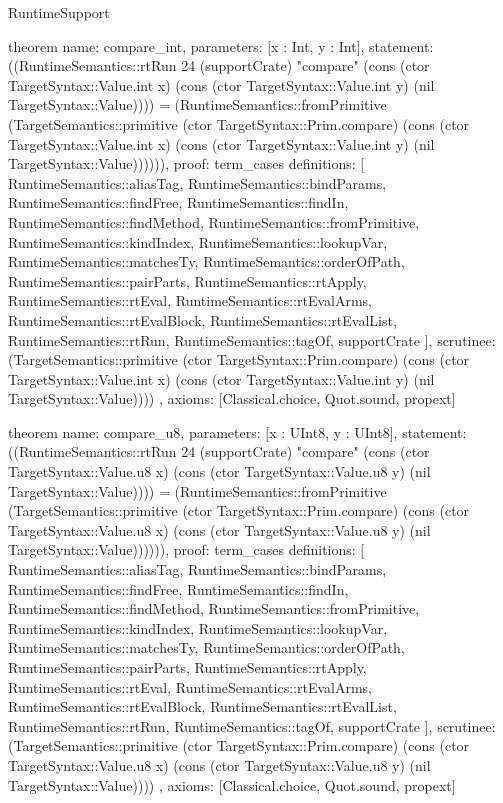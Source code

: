 \begin{lexlean}{RuntimeSupport}
\begin{semanticmodule}
theorem{
  name: compare_int,
  parameters: [x : Int, y : Int],
  statement: ((RuntimeSemantics::rtRun 24 (supportCrate) "compare" (cons (ctor TargetSyntax::Value.int x) (cons (ctor TargetSyntax::Value.int y) (nil TargetSyntax::Value)))) = (RuntimeSemantics::fromPrimitive (TargetSemantics::primitive (ctor TargetSyntax::Prim.compare) (cons (ctor TargetSyntax::Value.int x) (cons (ctor TargetSyntax::Value.int y) (nil TargetSyntax::Value)))))),
  proof: term_cases{
    definitions: [
      RuntimeSemantics::aliasTag,
      RuntimeSemantics::bindParams,
      RuntimeSemantics::findFree,
      RuntimeSemantics::findIn,
      RuntimeSemantics::findMethod,
      RuntimeSemantics::fromPrimitive,
      RuntimeSemantics::kindIndex,
      RuntimeSemantics::lookupVar,
      RuntimeSemantics::matchesTy,
      RuntimeSemantics::orderOfPath,
      RuntimeSemantics::pairParts,
      RuntimeSemantics::rtApply,
      RuntimeSemantics::rtEval,
      RuntimeSemantics::rtEvalArms,
      RuntimeSemantics::rtEvalBlock,
      RuntimeSemantics::rtEvalList,
      RuntimeSemantics::rtRun,
      RuntimeSemantics::tagOf,
      supportCrate
    ],
    scrutinee: (TargetSemantics::primitive (ctor TargetSyntax::Prim.compare) (cons (ctor TargetSyntax::Value.int x) (cons (ctor TargetSyntax::Value.int y) (nil TargetSyntax::Value))))
  },
  axioms: [Classical.choice, Quot.sound, propext]
}

theorem{
  name: compare_u8,
  parameters: [x : UInt8, y : UInt8],
  statement: ((RuntimeSemantics::rtRun 24 (supportCrate) "compare" (cons (ctor TargetSyntax::Value.u8 x) (cons (ctor TargetSyntax::Value.u8 y) (nil TargetSyntax::Value)))) = (RuntimeSemantics::fromPrimitive (TargetSemantics::primitive (ctor TargetSyntax::Prim.compare) (cons (ctor TargetSyntax::Value.u8 x) (cons (ctor TargetSyntax::Value.u8 y) (nil TargetSyntax::Value)))))),
  proof: term_cases{
    definitions: [
      RuntimeSemantics::aliasTag,
      RuntimeSemantics::bindParams,
      RuntimeSemantics::findFree,
      RuntimeSemantics::findIn,
      RuntimeSemantics::findMethod,
      RuntimeSemantics::fromPrimitive,
      RuntimeSemantics::kindIndex,
      RuntimeSemantics::lookupVar,
      RuntimeSemantics::matchesTy,
      RuntimeSemantics::orderOfPath,
      RuntimeSemantics::pairParts,
      RuntimeSemantics::rtApply,
      RuntimeSemantics::rtEval,
      RuntimeSemantics::rtEvalArms,
      RuntimeSemantics::rtEvalBlock,
      RuntimeSemantics::rtEvalList,
      RuntimeSemantics::rtRun,
      RuntimeSemantics::tagOf,
      supportCrate
    ],
    scrutinee: (TargetSemantics::primitive (ctor TargetSyntax::Prim.compare) (cons (ctor TargetSyntax::Value.u8 x) (cons (ctor TargetSyntax::Value.u8 y) (nil TargetSyntax::Value))))
  },
  axioms: [Classical.choice, Quot.sound, propext]
}


\end{semanticmodule}
\end{lexlean}
